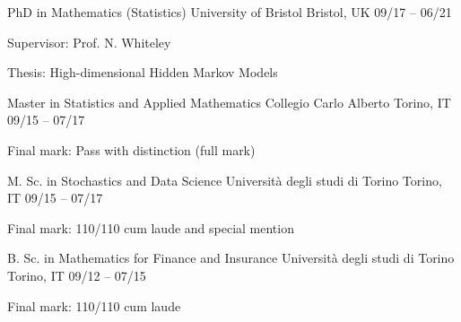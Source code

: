 

\begin{cventries}

  \cventry
    {PhD in Mathematics (Statistics)} %
    {University of Bristol} %
    {Bristol, UK} %
    {09\slash 17 -- 06\slash21} %
    {
      \begin{cvitems} %
        \item {Supervisor: Prof. N. Whiteley}
        \item {Thesis: High-dimensional Hidden Markov Models}
      \end{cvitems}
    }

  \cventry
    {Master in Statistics and Applied Mathematics} %
    {Collegio Carlo Alberto} %
    {Torino, IT} %
    {09\slash 15 -- 07\slash 17} %
    {
      \begin{cvitems} %
        \item {Final mark: Pass with distinction (full mark)}
      \end{cvitems}
    }

  \cventry
    {M. Sc. in Stochastics and Data Science}
    {Università degli studi di Torino}
    {Torino, IT}
    {09\slash 15 -- 07\slash 17}
    {
      \begin{cvitems} %
        \item {Final mark: 110\slash 110 cum laude and special mention}
      \end{cvitems}
    }
    
  \cventry
	{B. Sc. in Mathematics for Finance and Insurance}
	{Università degli studi di Torino}
	{Torino, IT}
	{09\slash 12 -- 07\slash 15}
    {
      \begin{cvitems} %
        \item {Final mark: 110\slash 110 cum laude}
      \end{cvitems}
    }

\end{cventries}
